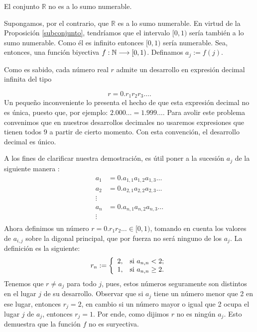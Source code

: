 \begin{teorema}\label{realnonum} El conjunto $\mathbb{R}$ no es
a lo sumo numerable.
\end{teorema}
\begin{demo} Supongamos, por el contrario, que $\mathbb{R}$ es a
lo sumo numerable. En virtud de la Proposición
\vref{subconjunto}, tendríamos que el intervalo $[0,1)$
sería también a lo sumo numerable. Como él es infinito
entonces $[0,1)$ sería numerable. Sea, entonces, una
función biyectiva $f:\mathbb{N}\longrightarrow [0,1)$. Definamos
$a_j:=f(j)$.

Como es sabido, cada número real $r$ admite un desarrollo en
expresión decimal infinita del tipo

\[r=0.r_1r_2r_3\dots.\]
Un peque\~no inconveniente lo presenta el hecho de que esta
expresión decimal no es única, puesto que, por ejemplo:
$2.000\dots=1.999\dots$. Para avolir este problema convenimos que
en nuestros desarrollos decimales no usaremos expresiones que
tienen todos $9$ a partir de cierto momento. Con esta
convención, el desarrollo decimal es único.

A los fines de clarificar nuestra demostración, es útil poner
a la sucesión $a_j$ de la siguiente manera :
\[\begin{split}
a_1&=0.a_{1,1}a_{1,2}a_{1,3}\dots\\
a_2&=0.a_{2,1}a_{2,2}a_{2,3}\dots\\
\vdots&\\
a_n&=0.a_{n,1}a_{n,2}a_{n,3}\dots\\
 \vdots&\\
 \end{split}\]
Ahora definimos un número $r=0.r_1r_2\dots\in[0,1)$, tomando en
cuenta los valores de $a_{i,j}$ sobre la digonal principal, que
por fuerza no será ninguno de los $a_j$. La definición es la
siguiente:
\[r_n:=\left\{
\begin{array}{ll}
    2, & \hbox{si $a_{n,n}<2$;} \\
    1, & \hbox{si $a_{n,n}\geq 2$.} \\
\end{array}
\right.
\]
Tenemos que $r\neq a_j$ para todo $j$, pues, estos números
seguramente son distintos en el lugar $j$ de su desarrollo.
Observar que si $a_j$ tiene un número menor que 2 en ese lugar,
entonces $r_j=2$, en cambio si un número mayor o igual que 2
ocupa el lugar $j$ de $a_j$, entonces $r_j=1$. Por ende, como
dijimos $r$ no es ningún $a_j$. Esto demuestra que la función
$f$ no es suryectiva.
\end{demo}

